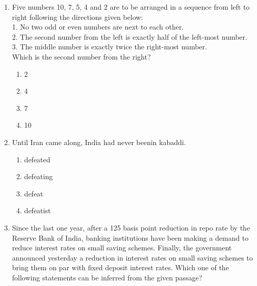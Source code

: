 \documentclass[journal,12pt,onecolumn]{IEEEtran}
\theoremstyle{remark}
\begin{document}
\begin{enumerate}[resume]
\begin{multicols}{4}
\begin{enumerate}
\item 17.1  
\item 21.0  
\item 33.1  
\item 72.8  
\end{enumerate}
\end{multicols}

\item Five numbers 10, 7, 5, 4 and 2 are to be arranged in a sequence from left to right following the directions given below:  \\
1. No two odd or even numbers are next to each other.  \\
2. The second number from the left is exactly half of the left-most number.  \\
3. The middle number is exactly twice the right-most number.  \\
Which is the second number from the right?

\begin{multicols}{4}
\begin{enumerate}
\item 2  
\item 4  
\item 7  
\item 10  
\end{enumerate}
\end{multicols}

\item Until Iran came along, India had never been\underline{\hspace{0.5em}}in kabaddi.

\begin{multicols}{4}
\begin{enumerate}
\item defeated  
\item defeating  
\item defeat  
\item defeatist  
\end{enumerate}
\end{multicols}

\item Since the last one year, after a 125 basis point reduction in repo rate by the Reserve Bank of India, banking institutions have been making a demand to reduce interest rates on small saving schemes. Finally, the government announced yesterday a reduction in interest rates on small saving schemes to bring them on par with fixed deposit interest rates.  
Which one of the following statements can be inferred from the given passage?


\end{enumerate}
\end{document}
